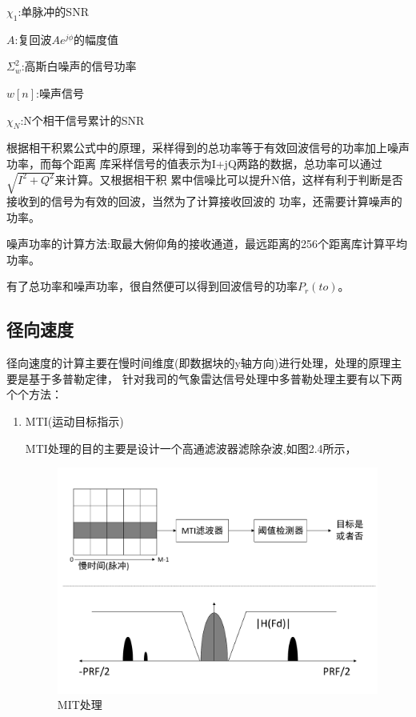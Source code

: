 \documentclass[a4paper,12pt]{report}
\begin{document}
\begin{spacing}{1.5}
\begin{proposition}[相干积累]
    $\chi_1$:单脉冲的SNR

    $A$:复回波$Ae^{j\phi}$的幅度值

    $\Sigma_w^2$:高斯白噪声的信号功率

    $w[n]$:噪声信号

    $\chi_N$:N个相干信号累计的SNR

\end{proposition}

根据相干积累公式中的原理，采样得到的总功率等于有效回波信号的功率加上噪声功率，而每个距离
库采样信号的值表示为I+jQ两路的数据，总功率可以通过$\sqrt{I^2+Q^2}$来计算。又根据相干积
累中信噪比可以提升N倍，这样有利于判断是否接收到的信号为有效的回波，当然为了计算接收回波的
功率，还需要计算噪声的功率。

噪声功率的计算方法:取最大俯仰角的接收通道，最远距离的256个距离库计算平均功率。

有了总功率和噪声功率，很自然便可以得到回波信号的功率$P_r(to)$。

\subsection{径向速度} 
径向速度的计算主要在慢时间维度(即数据块的y轴方向)进行处理，处理的原理主要是基于多普勒定律，
针对我司的气象雷达信号处理中多普勒处理主要有以下两个个方法：
\begin{enumerate}[1)]
    \itemindent=2em
    \item MTI(运动目标指示)
    
    \qquad MTI处理的目的主要是设计一个高通滤波器滤除杂波,如图2.4所示，

    \begin{figure}[hbtp]
    \centering
    \includegraphics [width=1.0\textwidth]{figure//MTI.pdf}
    \caption{MIT处理}\label{MTI}
    \end{figure}


\end{enumerate}
\end{spacing}
\end{document}
